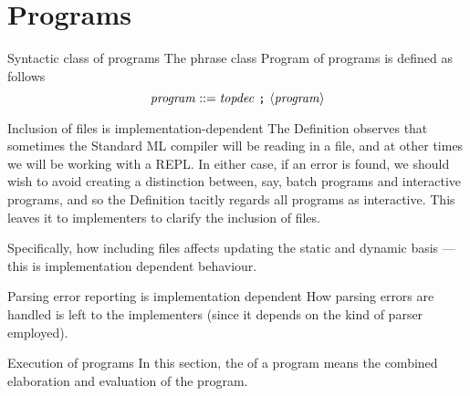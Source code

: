 \chapter{Programs}


\begin{definition}{Syntactic class of programs}
The phrase class Program of programs is defined as follows
\begin{equation*}
\textit{program\/} ::= \mbox{\textit{topdec\/}\ \texttt{;}\ $\langle\textit{program\/}\rangle$}
\end{equation*}
\end{definition}

\begin{clause}{Inclusion of files is implementation-dependent}
The Definition observes that sometimes the Standard ML compiler will be
reading in a file, and at other times we will be working with a REPL. In
either case, if an error is found, we should wish to avoid creating a
distinction between, say, batch programs and interactive programs, and
so the Definition tacitly regards all programs as interactive. This
leaves it to implementers to clarify the inclusion of files.  

Specifically, how including files affects updating the static and
dynamic basis --- this is implementation dependent behaviour.
\end{clause}

\begin{clause}{Parsing error reporting is implementation dependent}
How parsing errors are handled is left to the implementers (since it
depends on the kind of parser employed).
\end{clause}

\begin{clause}{Execution of programs}
In this section, the  of a program means the combined
elaboration and evaluation of the program.
\end{clause}

